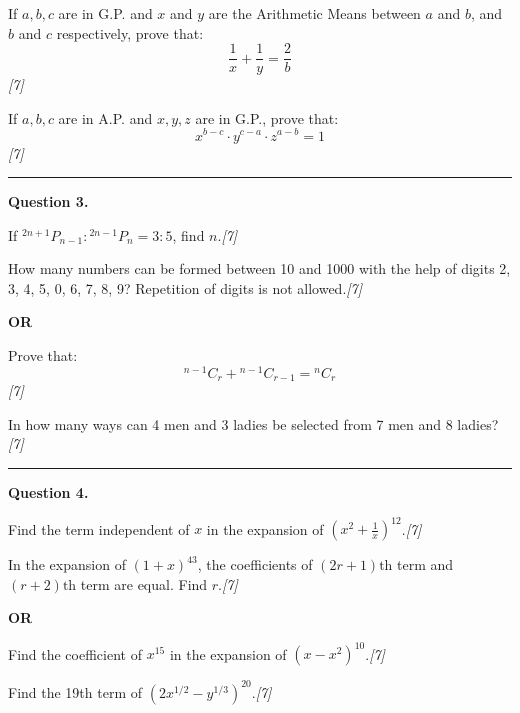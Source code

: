 \documentclass[11pt,a4paper]{article}
\newcommand{\pts}[1]{\hfill   \textit{[#1]}}
\begin{document}
\begin{parts}
  \item If $a, b, c$ are in G.P. and $x$ and $y$ are the Arithmetic Means between $a$ and $b$, and $b$ and $c$ respectively, prove that:
  \[
  \frac{1}{x} + \frac{1}{y} = \frac{2}{b}
  \]\pts{7}
  \item If $a, b, c$ are in A.P. and $x, y, z$ are in G.P., prove that:
  \[
  x^{b-c} \cdot y^{c-a} \cdot z^{a-b} = 1
  \]\pts{7}
\end{parts}

\medskip\rule{\linewidth}{0.2pt}

\pagebreak




\noindent   \textbf{Question 3.}

\begin{parts}
  \item If ${}^{2n+1}P_{n-1} : {}^{2n-1}P_n = 3:5$, find $n$.\pts{7}
  \item How many numbers can be formed between 10 and 1000 with the help of digits 2, 3, 4, 5, 0, 6, 7, 8, 9? Repetition of digits is not allowed.\pts{7}
\end{parts}

\centerline{   \textbf{OR}}


\begin{parts}
  \item Prove that:
  \[
  {}^{n-1}C_r + {}^{n-1}C_{r-1} = {}^nC_r
  \]\pts{7}
  \item In how many ways can 4 men and 3 ladies be selected from 7 men and 8 ladies?\pts{7}
\end{parts}

\medskip\rule{\linewidth}{0.2pt}




\noindent   \textbf{Question 4.}

\begin{parts}
  \item Find the term independent of $x$ in the expansion of $\left(x^2 + \frac{1}{x}\right)^{12}$.\pts{7}
  \item In the expansion of $(1 + x)^{43}$, the coefficients of $(2r + 1) \text{th}$ term and $(r + 2) \text{th}$ term are equal. Find $r$.\pts{7}
\end{parts}

\centerline{   \textbf{OR}}


\begin{parts}
  \item Find the coefficient of $x^{15}$ in the expansion of $(x - x^2)^{10}$.\pts{7}
  \item Find the 19th term of $\left(2x^{1/2} - y^{1/3}\right)^{20}$.\pts{7}
\end{parts}
\end{document}

